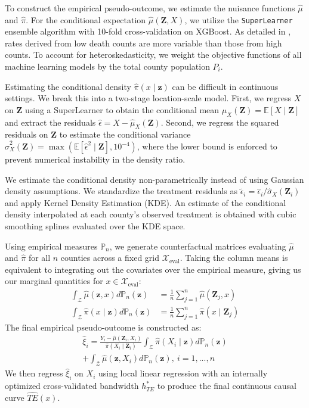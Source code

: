 \documentclass{article}
\theoremstyle{plain}
\theoremstyle{definition}
\theoremstyle{remark}
\begin{document}
To construct the empirical pseudo-outcome, we estimate the nuisance 
functions $\hat{\mu}$ and $\hat{\pi}$. For the conditional expectation 
$\hat{\mu}(\mathbf{Z}, X)$, we utilize the \texttt{SuperLearner} ensemble 
algorithm \citep{SuperLearner} with 10-fold cross-validation on
XGBoost. As detailed in \citet{cdc_wonder_cmf_doc}, rates derived from 
low death counts are more variable than those from high counts. To account for heteroskedasticity, we weight the objective functions 
of all machine learning models by the total county population $P_i$.

Estimating the conditional density $\hat{\pi}(x \mid \mathbf{z})$ can be difficult in continuous settings. We break this into a two-stage 
location-scale model. First, we regress $X$ on $\mathbf{Z}$ using a SuperLearner 
to obtain the conditional mean $\hat{\mu}_X(\mathbf{Z}) = \mathbb{E}[X \mid \mathbf{Z}]$ 
and extract the residuals $\hat{\epsilon} = X - \hat{\mu}_X(\mathbf{Z})$. 
Second, we regress the squared residuals on $\mathbf{Z}$ to estimate the 
conditional variance $\hat{\sigma}^2_X(\mathbf{Z}) = \max(\mathbb{E}[\hat{\epsilon}^2 \mid \mathbf{Z}], 10^{-4})$, 
where the lower bound is enforced to prevent numerical instability in the density 
ratio.

We estimate the 
conditional density non-parametrically instead of using Gaussian density assumptions. We standardize the treatment residuals 
as $\tilde{\epsilon}_i = \hat{\epsilon}_i / \hat{\sigma}_X(\mathbf{Z}_i)$ 
and apply Kernel Density Estimation (KDE). An estimate of the conditional density interpolated
at each county's observed treatment is obtained with cubic smoothing splines 
evaluated over the KDE space.

Using empirical measures $\mathbb{P}_n$, we generate counterfactual matrices 
evaluating $\hat{\mu}$ and $\hat{\pi}$ for all $n$ counties across a fixed 
grid $\mathcal{X}_{\text{eval}}$. Taking the column means is equivalent to integrating out the 
covariates over the empirical measure,
giving us our marginal quantities for $x \in \mathcal{X}_{\text{eval}}$:
\begin{align*}
    \int_{\mathcal{Z}} \hat{\mu}(\mathbf{z}, x) d\mathbb{P}_n(\mathbf{z}) &= \frac{1}{n} \sum_{j=1}^n \hat{\mu}(\mathbf{Z}_j, x) \\
    \int_{\mathcal{Z}} \hat{\pi}(x \mid \mathbf{z}) d\mathbb{P}_n(\mathbf{z}) &= \frac{1}{n} \sum_{j=1}^n \hat{\pi}(x \mid \mathbf{Z}_j)
\end{align*}
The final empirical 
pseudo-outcome is constructed as:
\begin{multline*}
\label{eq:pseudo}
    \hat{\xi}_i = \frac{Y_i - \hat{\mu}(\mathbf{Z}_i, X_i)}{\hat{\pi}(X_i \mid \mathbf{Z}_i)} \int_{\mathcal{Z}} \hat{\pi}(X_i \mid \mathbf{z}) d\mathbb{P}_n(\mathbf{z}) \\
    + \int_{\mathcal{Z}} \hat{\mu}(\mathbf{z}, X_i) d\mathbb{P}_n(\mathbf{z}), \ i=1,...,n
\end{multline*}
We then regress $\hat{\xi}_i$ on $X_i$ using local linear regression with an 
internally optimized cross-validated bandwidth $h_{TE}^*$ to produce the 
final continuous causal curve $\widehat{TE}(x)$.
\end{document}
